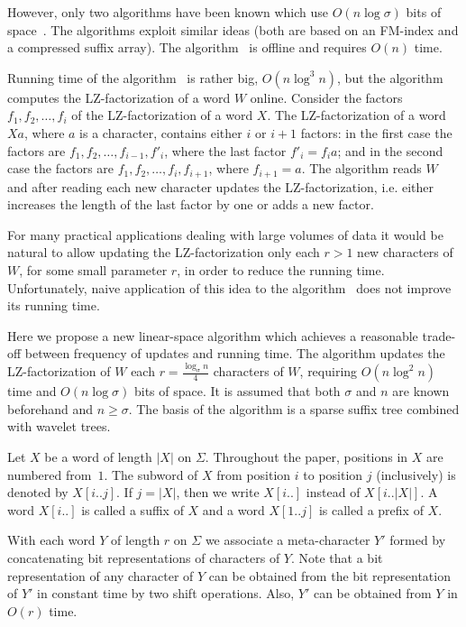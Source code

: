 \documentclass[10pt]{llncs}
\begin{document}
However, only two algorithms have been known which use $O(n \log \sigma)$ bits of space~\cite{Okanohara:2008:OAF:1431008.1431068,Ohlebusch:2011:LFR:2018243.2018249}. The algorithms exploit similar ideas (both are based on an FM-index and a compressed suffix array). The algorithm~\cite{Ohlebusch:2011:LFR:2018243.2018249} is offline and requires $O(n)$ time.

Running time of the algorithm~\cite{Okanohara:2008:OAF:1431008.1431068} is rather big, $O(n \log^3 n)$, but the algorithm computes the LZ-factorization of a word $W$ online. Consider the factors $f_1, f_2, \ldots, f_i$ of the LZ-factorization of a word $X$. The LZ-factorization of a word $Xa$, where $a$ is a character, contains either $i$ or $i+1$ factors: in the first case the factors are $f_1, f_2, \ldots, f_{i-1}, f'_i$, where the last factor $f'_i = f_i a$; and in the second case the factors are $f_1, f_2, \ldots, f_i, f_{i+1}$, where $f_{i+1} = a$. The algorithm reads $W$ and after reading each new character updates the LZ-factorization, i.e. either increases the length of the last factor by one or adds a new factor.

For many practical applications dealing with large volumes of data it would be natural to allow updating the LZ-factorization only each $r > 1$ new characters of $W$, for some small parameter $r$, in order to reduce the running time. Unfortunately, naive application of this idea to the algorithm~\cite{Okanohara:2008:OAF:1431008.1431068} does not improve its running time.

Here we propose a new linear-space algorithm which achieves a reasonable trade-off between frequency of updates and running time. The algorithm updates the LZ-factorization of $W$ each $r = \frac{\log_{\sigma}n}{4}$ characters of $W$, requiring $O(n \log^2{n})$ time and $O(n \log \sigma)$ bits of space. It is assumed that both $\sigma$ and $n$ are known beforehand and $n \geq \sigma$. The basis of the algorithm is a sparse suffix tree combined with wavelet trees.

Let $X$ be a word of length $|X|$ on $\Sigma$. Throughout the paper, positions in $X$ are numbered from~$1$. The subword of $X$ from position $i$ to position $j$ (inclusively) is denoted by $X[i..j]$. If $j = |X|$, then we write $X[i..]$ instead of $X[i..|X|]$. A word $X[i..]$ is called a suffix of $X$ and a word $X[1..j]$ is called a prefix of $X$.

With each word $Y$ of length $r$ on $\Sigma$ we associate a meta-character $Y'$ formed by concatenating bit representations of characters of $Y$. Note that a bit representation of any character of $Y$ can be obtained from the bit representation of $Y'$ in constant time by two shift operations. Also, $Y'$ can be obtained from $Y$ in $O(r)$ time.
\end{document}
